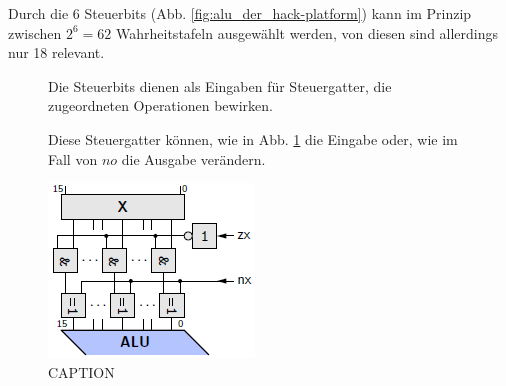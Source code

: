 \documentclass[12pt]{report}
\begin{document}
Durch die 6 Steuerbits (Abb. \ref{fig:alu_der_hack-platform}) kann im Prinzip zwischen 
$2^6=62$ Wahrheitstafeln ausgewählt werden, von diesen sind allerdings nur 18 relevant.

\begin{defbox}
  \begin{figure}[H]
    \begin{minipage}[t]{0.45\textwidth}
      Die Steuerbits dienen als Eingaben für Steuergatter, die zugeordneten
      Operationen bewirken.
      
      Diese Steuergatter können, wie in Abb. \ref{fig:alu_steuerbits} die Eingabe oder,
      wie im Fall von $no$ die Ausgabe verändern.
    \end{minipage}
    \hfill
    \begin{minipage}[t]{0.45\textwidth}
      \caption{CAPTION}
      \label{fig:alu_steuerbits}
      \centering
      \includegraphics{alu_steuerbits}
    \end{minipage}
  \end{figure}
\end{defbox}
\end{document}
